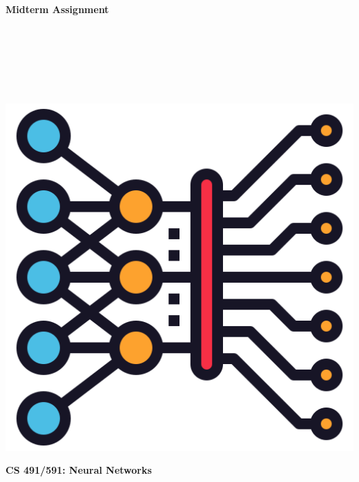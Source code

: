 \documentclass{article}
\begin{document}
\begin{titlepage}
\begin{center}
\vspace*{1cm}
            
\Huge
\textbf{Midterm Assignment}
            
\vspace{1cm}

\Large
{}

\vspace{2cm}

 \\
 \\
 \\
 \\
 \\

\vspace{2cm}

\includegraphics[scale=0.25]{../figs/icon.png}\\[0.5cm]

\vspace{9cm}

\textbf{CS 491/591: Neural Networks} \\

\end{center}
\end{titlepage}
\newpage
\end{document}
